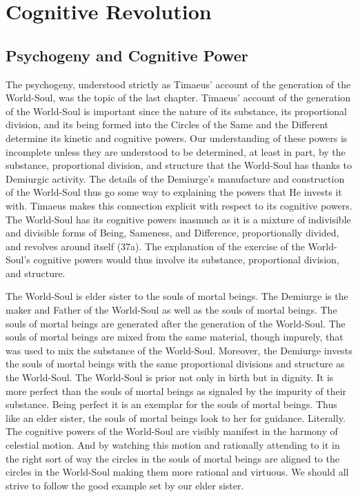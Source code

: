 
\chapter{Cognitive Revolution} %
\label{cha:cognitive_revolution}

\section{Psychogeny and Cognitive Power} %
\label{sec:psychogeny_and_psychic_power}

The psychogeny, understood strictly as Timaeus' account of the generation of the World-Soul, was the topic of the last chapter. Timaeus' account of the generation of the World-Soul is important since the nature of its substance, its proportional division, and its being formed into the Circles of the Same and the Different determine its kinetic and cognitive powers. Our understanding of these powers is incomplete unless they are understood to be determined, at least in part, by the substance, proportional division, and structure that the World-Soul has thanks to Demiurgic activity. The details of the Demiurge's manufacture and construction of the World-Soul thus go some way to explaining the powers that He invests it with. Timaeus makes this connection explicit with respect to its cognitive powers. The World-Soul has its cognitive powers inasmuch as it is a mixture of indivisible and divisible forms of Being, Sameness, and Difference, proportionally divided, and revolves around itself (37a). The explanation of the exercise of the World-Soul's cognitive powers would thus involve its substance, proportional division, and structure.

The World-Soul is elder sister to the souls of mortal beings. The Demiurge is the maker and Father of the World-Soul as well as the souls of mortal beings. The souls of mortal beings are generated after the generation of the World-Soul. The souls of mortal beings are mixed from the same material, though impurely, that was used to mix the substance of the World-Soul. Moreover, the Demiurge invests the souls of mortal beings with the same proportional divisions and structure as the World-Soul. The World-Soul is prior not only in birth but in dignity. It is more perfect than the souls of mortal beings as signaled by the impurity of their substance. Being perfect it is an exemplar for the souls of mortal beings. Thus like an elder sister, the souls of mortal beings look to her for guidance. Literally. The cognitive powers of the World-Soul are visibly manifest in the harmony of celestial motion. And by watching this motion and rationally attending to it in the right sort of way the circles in the souls of mortal beings are aligned to the circles in the World-Soul making them more rational and virtuous. We should all strive to follow the good example set by our elder sister.

